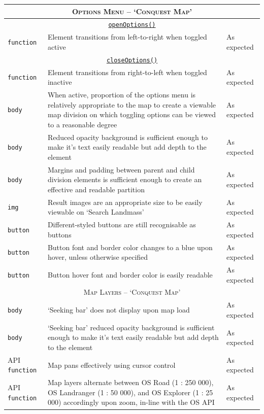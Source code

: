 \documentclass[11pt, english]{article}
\begin{document}
\begin{center}
\begin{longtable}{p{3cm}p{8cm}p{2cm}}
		\multicolumn{3}{c}{\textsc{Options Menu -- `Conquest Map'}}\\
		\hline
		\multicolumn{3}{c}{\underline{\texttt{openOptions()}}}\\
		\texttt{function} & Element transitions from left-to-right when toggled active & As expected\\
		\multicolumn{3}{c}{\underline{\texttt{closeOptions()}}}\\
		\texttt{function} & Element transitions from right-to-left when toggled inactive & As expected\\
		\texttt{body} & When active, proportion of the options menu is relatively appropriate to the map to create a viewable map division on which toggling options can be viewed to a reasonable degree & As expected\\
		\texttt{body} & Reduced opacity background is sufficient enough to make it's text easily readable but add depth to the element & As expected\\
		\texttt{body} & Margins and padding between parent and child division elements is sufficient enough to create an effective and readable partition & As expected\\
		\texttt{img} & Result images are an appropriate size to be easily viewable on `Search Landmass' & As expected\\
		\texttt{button} & Different-styled buttons are still recognisable as buttons & As expected\\
		\texttt{button} & Button font and border color changes to a blue upon hover, unless otherwise specified & As expected\\
		\texttt{button} & Button hover font and border color is easily readable & As expected\\
		\hline
		\multicolumn{3}{c}{\textsc{Map Layers -- `Conquest Map'}}\\
		\hline
		\texttt{body} & `Seeking bar' does not display upon map load & As expected\\
		\texttt{body} & `Seeking bar' reduced opacity background is sufficient enough to make it's text easily readable but add depth to the element & As expected\\
		API \texttt{function} & Map pans effectively using cursor control & As expected\\
		API \texttt{function} & Map layers alternate between OS Road (1 : 250 000), OS Landranger (1 : 50 000), and OS Explorer (1 : 25 000) accordingly upon zoom, in-line with the OS API & As expected\\

\end{longtable}
\end{center}
\end{document}
